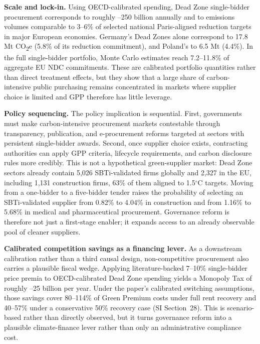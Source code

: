 \documentclass[11pt,a4paper]{article}
\begin{document}
\textbf{Scale and lock-in.} Using OECD-calibrated spending, Dead Zone single-bidder procurement corresponds to roughly --250 billion annually and to emissions volumes comparable to 3--6\% of selected national Paris-aligned reduction targets in major European economies. Germany's Dead Zones alone correspond to 17.8 Mt CO\textsubscript{2}e (5.8\% of its reduction commitment), and Poland's to 6.5 Mt (4.4\%). In the full single-bidder portfolio, Monte Carlo estimates reach 7.2--11.8\% of aggregate EU NDC commitments. These are calibrated portfolio quantities rather than direct treatment effects, but they show that a large share of carbon-intensive public purchasing remains concentrated in markets where supplier choice is limited and GPP therefore has little leverage.

\textbf{Policy sequencing.} The policy implication is sequential. First, governments must make carbon-intensive procurement markets contestable through transparency, publication, and e-procurement reforms targeted at sectors with persistent single-bidder awards. Second, once supplier choice exists, contracting authorities can apply GPP criteria, lifecycle requirements, and carbon disclosure rules more credibly. This is not a hypothetical green-supplier market: Dead Zone sectors already contain 5,026 SBTi-validated firms globally and 2,327 in the EU, including 1,131 construction firms, 63\% of them aligned to 1.5$^{\circ}$C targets. Moving from a one-bidder to a five-bidder tender raises the probability of selecting an SBTi-validated supplier from 0.82\% to 4.04\% in construction and from 1.16\% to 5.68\% in medical and pharmaceutical procurement. Governance reform is therefore not just a first-stage enabler; it expands access to an already observable pool of cleaner suppliers.

\textbf{Calibrated competition savings as a financing lever.} As a downstream calibration rather than a third causal design, non-competitive procurement also carries a plausible fiscal wedge. Applying literature-backed 7--10\% single-bidder price premia to OECD-calibrated Dead Zone spending yields a Monopoly Tax of roughly --25 billion per year. Under the paper's calibrated switching assumptions, those savings cover 80--114\% of Green Premium costs under full rent recovery and 40--57\% under a conservative 50\% recovery case (SI Section~28). This is scenario-based rather than directly observed, but it turns governance reform into a plausible climate-finance lever rather than only an administrative compliance cost.
\end{document}
